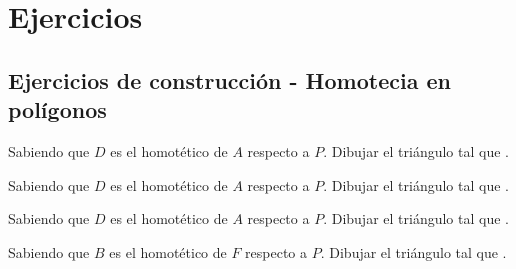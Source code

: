 \section{Ejercicios}

\subsection{Ejercicios de construcción - Homotecia en polígonos}

\begin{section-exercise}
    Sabiendo que $D$ es el homotético de $A$ respecto a $P$.
    Dibujar el triángulo  tal que .
    \vspace*{\fill}
    \begin{figure}[H]
        \centering
        
    \end{figure}
    \vspace*{\fill}
\end{section-exercise}

\newpage
\begin{section-exercise}
    Sabiendo que $D$ es el homotético de $A$ respecto a $P$.
    Dibujar el triángulo  tal que .
    \vspace*{\fill}
    \begin{figure}[H]
        \centering
        
    \end{figure}
    \vspace*{\fill}
\end{section-exercise}

\newpage
\begin{section-exercise}
    Sabiendo que $D$ es el homotético de $A$ respecto a $P$.
    Dibujar el triángulo  tal que .
    \vspace*{\fill}
    \begin{figure}[H]
        \centering
        
    \end{figure}
    \vspace*{\fill}
\end{section-exercise}

\newpage
\begin{section-exercise}
    Sabiendo que $B$ es el homotético de $F$ respecto a $P$.
    Dibujar el triángulo  tal que .
    \vspace*{\fill}
    \begin{figure}[H]
        \centering
        
    \end{figure}
    \vspace*{\fill}
\end{section-exercise}

